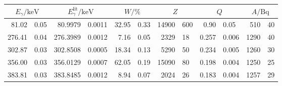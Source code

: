 \label{tab:D2}
	\begin{tabular}{r@{${}\pm{}$}lr@{${}\pm{}$}lr@{${}\pm{}$}lr@{${}\pm{}$}lr@{${}\pm{}$}lr@{${}\pm{}$}l}
		\toprule
		\multicolumn{2}{c}{$E_\gamma/\si{\kilo\electronvolt}$} & \multicolumn{2}{c}{$E_\gamma^{\text{lit}}/\si{\kilo\electronvolt}$} & \multicolumn{2}{c}{$W/\si{\percent}$} & \multicolumn{2}{c}{$Z$} & \multicolumn{2}{c}{$Q$} & \multicolumn{2}{c}{$A/\si{\becquerel}$} \\
		\midrule
		81.02 & 0.05  & 80.9979  & 0.0011 & 32.95 & 0.33 & 14900 & 600 & 0.90  & 0.05  &  510 & 40 \\
		276.41 & 0.04 & 276.3989 & 0.0012 & 7.16  & 0.05 &  2329 &  18 & 0.257 & 0.006 & 1290 & 40 \\
		302.87 & 0.03 & 302.8508 & 0.0005 & 18.34 & 0.13 &  5290 &  50 & 0.234 & 0.005 & 1260 & 30 \\
		356.00 & 0.03 & 356.0129 & 0.0007 & 62.05 & 0.19 & 15090 &  80 & 0.198 & 0.004 & 1250 & 25 \\
		383.81 & 0.03 & 383.8485 & 0.0012 & 8.94  & 0.07 &  2024 &  26 & 0.183 & 0.004 & 1257 & 29 \\
		\bottomrule
	\end{tabular}
